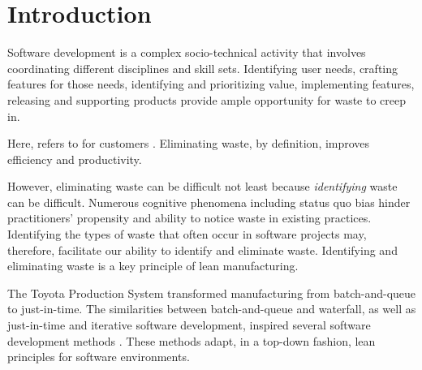 \section{Introduction}

Software development is a complex socio-technical activity that involves coordinating different disciplines and skill sets. Identifying user needs, crafting features for those needs, identifying and prioritizing value, implementing features, releasing and supporting products provide ample opportunity for waste to creep in. 

Here,  refers to  for customers \cite{WomackLeanThinking}. Eliminating waste, by definition, improves efficiency and productivity. 

However, eliminating waste can be difficult not least because \textit{identifying} waste can be difficult.  Numerous cognitive phenomena including status quo bias \cite{JostDecadeOfSystemJustification} hinder practitioners' propensity and ability to notice waste in existing practices. Identifying the types of waste that often occur in software projects  may, therefore, facilitate our ability to identify and eliminate waste. Identifying and eliminating waste is a key principle of lean manufacturing. 

The Toyota Production System \cite{OhnoToyotaProductionSystem, ShingoToyotaProductionSystem} transformed manufacturing from batch-and-queue to just-in-time. The similarities between batch-and-queue and waterfall, as well as just-in-time and iterative software development, inspired several software development methods \cite{PoppendieckLeanSoftwareDevelopment, AndersonKanban}. These methods adapt, in a top-down fashion, lean principles for software environments. 

